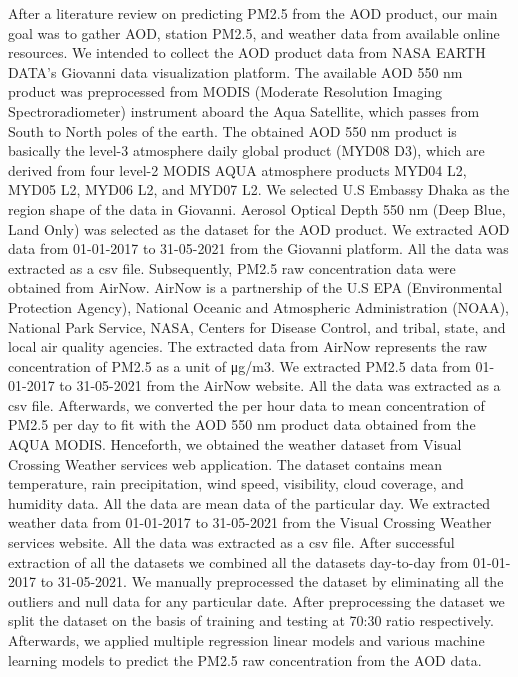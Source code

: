 After a literature review on predicting PM2.5 from the AOD product, our main goal was to gather AOD, station PM2.5, and weather data from available online resources. We intended to collect the AOD product data from NASA EARTH DATA’s Giovanni data visualization platform. The available AOD 550 nm product was preprocessed from MODIS (Moderate Resolution Imaging Spectroradiometer) instrument aboard the Aqua Satellite, which passes from South to North poles of the earth. The obtained AOD 550 nm product is basically the level-3 atmosphere daily global product (MYD08 D3), which are derived from four level-2 MODIS AQUA atmosphere products MYD04 L2, MYD05 L2, MYD06 L2, and MYD07 L2. We selected U.S Embassy Dhaka as the region shape of the data in Giovanni. Aerosol Optical Depth 550 nm (Deep Blue, Land Only) was selected as the dataset for the AOD product. We extracted AOD data from 01-01-2017 to 31-05-2021 from the Giovanni platform. All the data was extracted as a csv file. Subsequently, PM2.5 raw concentration data were obtained from AirNow. AirNow is a partnership of the U.S EPA (Environmental Protection Agency), National Oceanic and Atmospheric Administration (NOAA), National Park Service, NASA, Centers for Disease Control, and tribal, state, and local air quality agencies. The extracted data from AirNow represents the raw concentration of PM2.5 as a unit of μg/m3. We extracted PM2.5 data from 01-01-2017 to 31-05-2021 from the AirNow website. All the data was extracted as a csv file. Afterwards, we converted the per hour data to mean concentration of PM2.5 per day to fit with the AOD 550 nm product data obtained from the AQUA MODIS. Henceforth, we obtained the weather dataset from Visual Crossing Weather services web application. The dataset contains mean temperature, rain precipitation, wind speed, visibility, cloud coverage, and humidity data. All the data are mean data of the particular day. We extracted weather data from 01-01-2017 to 31-05-2021 from the Visual Crossing Weather services website. All the data was extracted as a csv file. After successful extraction of all the datasets we combined all the datasets day-to-day from 01-01-2017 to 31-05-2021. We manually preprocessed the dataset by eliminating all the outliers and null data for any particular date. After preprocessing the dataset we split the dataset on the basis of training and testing at 70:30 ratio respectively. Afterwards, we applied multiple regression linear models and various machine learning models to predict the PM2.5 raw concentration from the AOD data. 

